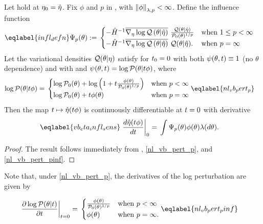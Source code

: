 \begin{cor}
%
Let  hold at $\eta_0 = \hat\eta$.
%
Fix $\phi$ and $p$ in , with $\left\Vert\phi\right\Vert_{\lambda,p} <
\infty$.  Define the influence function
%
\begin{align}\eqlabel{infl_defn}
%
\infl_p(\theta) :={}&
\begin{cases}
    - \hessopt^{-1}
        \lqgradbar{\theta \vert \etaopt}
        \frac{\q(\theta \vert \etaopt)}{\pbase(\theta)^{1/p}}
& \textrm{when }1 \le p < \infty \\
%
    - \hessopt^{-1}
        \lqgradbar{\theta \vert \etaopt}
        \q(\theta \vert \etaopt).
& \textrm{when }p = \infty
%
\end{cases}
%
\end{align}
%
Let the variational densities $\mathcal{Q}(\theta \vert \eta)$ satisfy
 for $t_0 = 0$ with both $\psi(\theta, t) \equiv 1$ (no
$\theta$ dependence) and with and $\psi(\theta, t) = \log \mathcal{P}(\theta \vert t
\phi)$, where
%
\begin{align}
%
\logp(\theta \vert \t \phi) ={}&
\begin{cases}
    \log \pbase(\theta) +
        \log\left(1 + \t \frac{\phi(\theta)}{\pbase(\theta)^{1/p}}\right)
    & \textrm{when }p < \infty \\
    \log \pbase(\theta) + \t \phi(\theta)
    & \textrm{when }p = \infty
%
\end{cases}  \eqlabel{nl_vb_pert_p}
%
\end{align}
%
Then the map $t \mapsto \hat\eta(t \phi)$ is continuously
differentiable at $t=0$ with derivative
%
\begin{align}\eqlabel{vb_eta_infl_sens}
%
\fracat{d \etaopt(\t \phi)}{d \t}{0} ={}&
    \int \infl_p(\theta) \phi(\theta) \lambda(d\theta).
%
\end{align}
%
\begin{proof}
%
The result follows immediately from , \eqref{nl_vb_pert_p},
and \eqref{nl_vb_pert_pinf}.
%
\end{proof}
%
\end{cor}



Note that, under \eqref{nl_vb_pert_p}, the derivatives of the
log perturbation are given by

\begin{align}
%
\fracat{\partial \log \p(\theta \vert \t)}{\partial \t}{\t=0} ={}&
\begin{cases}
   \frac{\phi(\theta)}{\pbase(\theta)^{1/p}}
   & \textrm{when }p < \infty \\
   \phi(\theta)
   & \textrm{when }p = \infty.
\end{cases}\eqlabel{nl_vb_pert_pinf}
%
\end{align}
